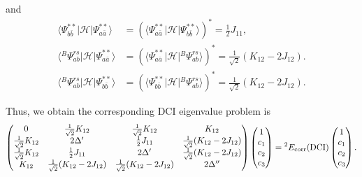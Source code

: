 \documentclass[a4paper]{book}
\newcounter{solution}[chapter]
\newcommand{\corr}{{\rm corr}}
\newcommand{\DCI}{{\rm DCI}}
\begin{document}
\begin{solution}
\[	\]	
	and
	\begin{align*}
		\langle \Psi^{**}_{b\bar{b}} | \mathscr{H} | \Psi^{**}_{a\bar{a}} \rangle &= ( \langle \Psi^{**}_{a\bar{a}} | \mathscr{H} | \Psi^{**}_{b\bar{b}} \rangle )^* = \frac{1}{2} J_{11} , \\
		\langle {}^B \Psi^{rs}_{ab} | \mathscr{H} | \Psi^{**}_{a\bar{a}} \rangle &= ( \langle \Psi^{**}_{a\bar{a}} | \mathscr{H} | {}^B \Psi^{rs}_{ab} \rangle )^* = \frac{1}{ \sqrt{2} } \left( K_{12} - 2 J_{12} \right). \\
		\langle {}^B \Psi^{rs}_{ab} | \mathscr{H} | \Psi^{**}_{b\bar{b}} \rangle &= ( \langle \Psi^{**}_{b\bar{b}} | \mathscr{H} | {}^B \Psi^{rs}_{ab} \rangle )^* = \frac{1}{ \sqrt{2} } \left( K_{12} - 2 J_{12} \right).
	\end{align*}
	
	Thus, we obtain the corresponding DCI eigenvalue problem is
	\[
	\begin{pmatrix}
		0 & \frac{1}{\sqrt{2}}K_{12} & \frac{1}{\sqrt{2}} K_{12} & K_{12} \\
		\frac{1}{\sqrt{2}}K_{12} & 2\Delta^\prime & \frac{1}{2}J_{11} & \frac{1}{\sqrt{2}}(K_{12} - 2 J_{12}) \\
		\frac{1}{\sqrt{2}}K_{12} & \frac{1}{2}J_{11} & 2\Delta^\prime & \frac{1}{\sqrt{2}}(K_{12} - 2 J_{12}) \\
		K_{12} & \frac{1}{\sqrt{2}}(K_{12} - 2J_{12}) & \frac{1}{\sqrt{2}}(K_{12} - 2J_{12}) & 2\Delta^{\prime\prime}
	\end{pmatrix} \begin{pmatrix}
	1 \\ c_1 \\ c_2 \\ c_3
	\end{pmatrix} = {}^2 E_\corr (\DCI) \begin{pmatrix}
	1 \\ c_1 \\ c_2 \\ c_3
	\end{pmatrix}.
	\]
	

\end{solution}
\end{document}
